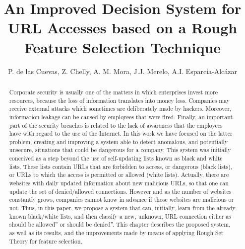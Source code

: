 \documentclass{llncs}
\begin{document}

\title{An Improved Decision System for URL Accesses based on a Rough Feature Selection Technique}


\author{P. de las Cuevas, Z. Chelly, A. M. Mora, J.J. Merelo, A.I. Esparcia-Alcázar}


\maketitle

%
%
\begin{abstract} 
Corporate security is usually one of the matters in which enterprises invest more resources, because the loss of information translates into money loss. Companies may receive external attacks which sometimes are deliberately made by hackers. Moreover, information leakage can be caused by employees that were fired. Finally, an important part of the security breaches is related to the lack of awareness that the employees have with regard to the use of the Internet. In this work we have focused on the latter problem, creating and improving a system able to detect anomalous, and potentially unsecure, situations that could be dangerous for a company. This system was initially conceived as a step beyond the use of self-updating lists known as black and white lists. These lists contain URLs that are forbidden to access, or dangerous (black lists), or URLs to which the access is permitted or allowed (white lists). Actually, there are websites with daily updated information about new malicious URLs, so that one can update the set of denied/allowed connections. However and as the number of websites constantly grows, companies cannot know in advance if those websites are malicious or not. Thus, in this paper, we propose a system that can, initially, learn from the already known black/white lists, and then classify a new, unknown, URL connection either as should be allowed'' or should be denied''. This chapter describes the proposed system, as well as its results, and the improvements made by means of applying Rough Set Theory for feature selection.

\end{abstract}
\end{document}
